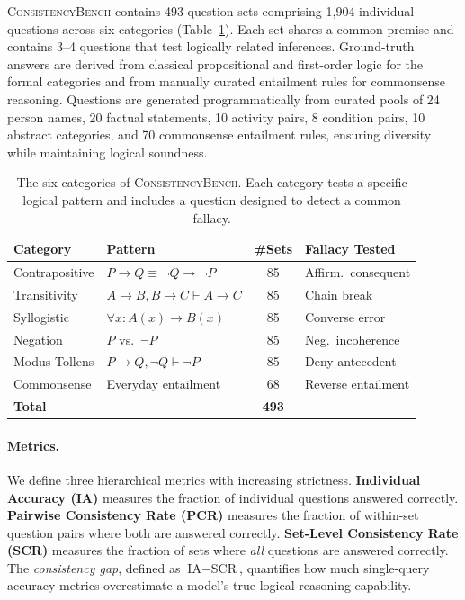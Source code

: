 \documentclass{article}
\newcommand{\bench}{\textsc{ConsistencyBench}}
\begin{document}
\bench{} contains 493 question sets comprising 1,904 individual questions across six categories (Table~\ref{tab:categories}). Each set shares a common premise and contains 3--4 questions that test logically related inferences. Ground-truth answers are derived from classical propositional and first-order logic for the formal categories and from manually curated entailment rules for commonsense reasoning. Questions are generated programmatically from curated pools of 24 person names, 20 factual statements, 10 activity pairs, 8 condition pairs, 10 abstract categories, and 70 commonsense entailment rules, ensuring diversity while maintaining logical soundness.

\begin{table}[t]
\caption{The six categories of \bench{}. Each category tests a specific logical pattern and includes a question designed to detect a common fallacy.}
\label{tab:categories}
\vspace{-0.5em}
\begin{center}
\small
\begin{tabular}{llcl}
\toprule
\textbf{Category} & \textbf{Pattern} & \textbf{\#Sets} & \textbf{Fallacy Tested} \\
\midrule
Contrapositive & $P{\to}Q \equiv \neg Q{\to}\neg P$ & 85 & Affirm.\ consequent \\
Transitivity & $A{\to}B, B{\to}C \vdash A{\to}C$ & 85 & Chain break \\
Syllogistic & $\forall x: A(x){\to}B(x)$ & 85 & Converse error \\
Negation & $P$ vs.\ $\neg P$ & 85 & Neg.\ incoherence \\
Modus Tollens & $P{\to}Q, \neg Q \vdash \neg P$ & 85 & Deny antecedent \\
Commonsense & Everyday entailment & 68 & Reverse entailment \\
\midrule
\textbf{Total} & & \textbf{493} & \\
\bottomrule
\end{tabular}
\end{center}
\vspace{-1em}
\end{table}

\paragraph{Metrics.} We define three hierarchical metrics with increasing strictness. \textbf{Individual Accuracy (IA)} measures the fraction of individual questions answered correctly. \textbf{Pairwise Consistency Rate (PCR)} measures the fraction of within-set question pairs where both are answered correctly. \textbf{Set-Level Consistency Rate (SCR)} measures the fraction of sets where \emph{all} questions are answered correctly. The \emph{consistency gap}, defined as $\text{IA} - \text{SCR}$, quantifies how much single-query accuracy metrics overestimate a model's true logical reasoning capability.
\end{document}
